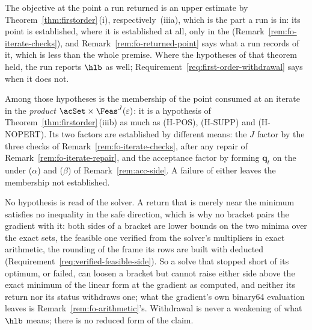 \begin{remark}\label{rem:fo-interface}
The objective at the point a run returned is an upper estimate by
Theorem~\ref{thm:firstorder}\,(i), respectively~(iiia), which is the part a
run is in: its point is established, where it is established at all, only
in the  (Remark~\ref{rem:fo-iterate-checks}), and
Remark~\ref{rem:fo-returned-point} says what a run records of it, which is
less than the whole premise. Where the hypotheses of that theorem held, the
run reports $\hlb$ as well; Requirement~\ref{req:first-order-withdrawal} says
when it does not.

Among those hypotheses is the membership of the point consumed at an iterate
in the \emph{product} $\acSet\times\Feas^{J}(\varepsilon)$: it is a
hypothesis of Theorem~\ref{thm:firstorder}\,(iiib) as much as (H-POS),
(H-SUPP) and (H-NOPERT). Its two factors are established by different
means: the $J$ factor by the three checks of
Remark~\ref{rem:fo-iterate-checks}, after any repair of
Remark~\ref{rem:fo-iterate-repair}, and the acceptance factor by forming
$\mathbf q_t$ on the  under ($\alpha$) and ($\beta$) of
Remark~\ref{rem:acc-side}. A failure of either leaves the membership not
established.

No hypothesis is read of the solver. A return that is merely near the
minimum satisfies no inequality in the safe direction, which is why no
bracket pairs the gradient with it: both sides of a bracket are lower
bounds on the two minima over the exact sets, the feasible one verified
from the solver's multipliers in exact arithmetic, the rounding of the
frame its rows are built with deducted
(Requirement~\ref{req:verified-feasible-side}). So a solve that stopped
short of its optimum, or failed, can loosen a bracket but cannot raise
either side above the exact minimum of the linear form at the gradient as
computed, and neither its return nor its status withdraws one; what the
gradient's own binary64 evaluation leaves is
Remark~\ref{rem:fo-arithmetic}'s. Withdrawal is never a weakening of what
$\hlb$ means; there is no reduced form of the claim.
\end{remark}

